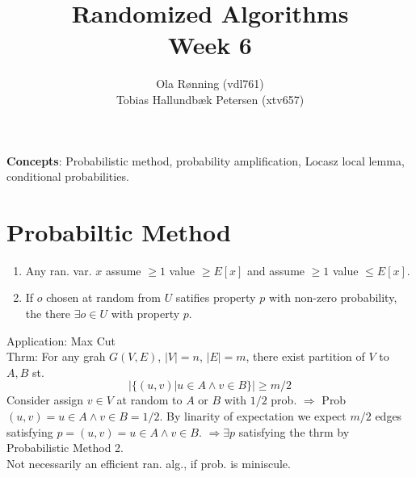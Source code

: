 \documentclass[a4paper]{article}
\author{Ola Rønning (vdl761)\\Tobias Hallundbæk Petersen (xtv657)}
\title{Randomized Algorithms \\ Week 6}
\begin{document}
\textbf{Concepts}: Probabilistic method, probability amplification, Locasz local lemma, conditional probabilities.\\
\section{Probabiltic Method}
\begin{enumerate}
\item Any ran. var. \(x\) assume \(\geq 1\) value \(\geq E[x]\) and assume \(\geq 1\) value \(\leq E[x]\).
\item If \(o\) chosen at random from \(U\) satifies property \(p\) with non-zero probability, the there \(\exists o \in U\) with property \(p\).
\end{enumerate}
Application: Max Cut\\
Thrm: For any grah \(G(V,E)\), \(|V|=n\), \(|E|=m\), there exist partition of \(V\) to \(A,B\) st.
\[|\{(u,v)|u\in A \wedge v\in B\}| \geq m/2\]
Consider assign \(v\in V\) at random to \(A\) or \(B\) with \(1/2\) prob. \(\Rightarrow\) Prob \((u,v)=u\in A \wedge v\in B = 1/2\). By linarity of expectation we expect \(m/2\) edges satisfying \(p=(u,v)=u\in A \wedge v\in B\). \(\Rightarrow \exists p\) satisfying the thrm by Probabilistic Method 2.\\
Not necessarily an efficient ran. alg., if prob. is miniscule.
\end{document}
